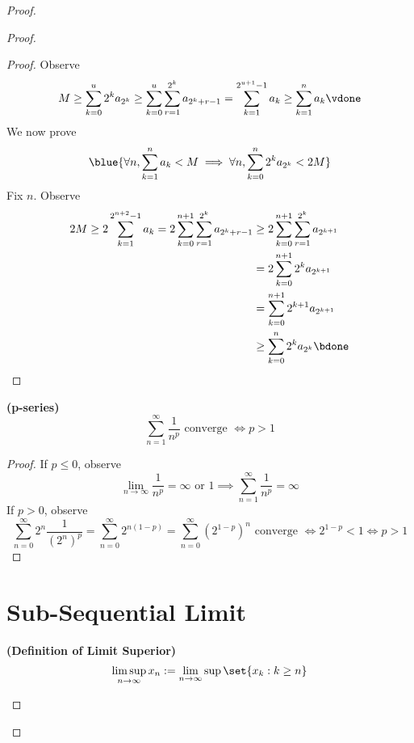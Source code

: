 \documentclass{report}
\begin{document}
\begin{proof}
\begin{proof}
\begin{proof}
Observe
\begin{equation*}
M\geq \sum_{k=0}^u 2^k a_{2^k}\geq \sum_{k=0}^u \sum_{r=1}^{2^k} a_{2^{k}+r-1}=\sum_{k=1}^{2^{u+1}-1} a_k\geq \sum_{k=1}^n a_k\vdone
\end{equation*}
We now prove
\begin{equation*}
  \blue{\forall n,\sum_{k=1}^n a_k<M\implies \forall n, \sum_{k=0}^n 2^ka_{2^k}<2M}
\end{equation*}
Fix $n$. Observe
\begin{align*}
  2M\geq 2\sum_{k=1}^{2^{n+2}-1} a_k=2\sum_{k=0}^{n+1}\sum_{r=1}^{2^k}a_{2^k+r-1}&\geq 2\sum_{k=0}^{n+1} \sum_{r=1}^{2^k}a_{2^{k+1}}\\
  &=2\sum_{k=0}^{n+1} 2^ka_{2^{k+1}}\\
  &=\sum_{k=0}^{n+1} 2^{k+1}a_{2^{k+1}}\\
  &\geq \sum_{k=0}^n 2^{k}a_{2^k}\bdone
\end{align*}
\end{proof}
\begin{corollary}
\label{4.3.12}
\textbf{(p-series)}
\begin{equation*}
\sum_{n=1}^\infty \frac{1}{n^p}\text{ converge }\iff  p>1
\end{equation*}
\end{corollary}
\begin{proof}
If $p\leq 0$, observe
\begin{equation*}
\lim_{n\to\infty}\frac{1}{n^p}=\infty\text{ or }1\implies \sum_{n=1}^\infty \frac{1}{n^p}=\infty
\end{equation*}
If $p>0$, observe
 \begin{equation*}
\sum_{n=0}^\infty 2^n \frac{1}{(2^n)^p}=\sum_{n=0}^\infty 2^{n(1-p)}=\sum_{n=0}^\infty (2^{1-p})^n\text{ converge }\iff 2^{1-p}<1\iff p>1
\end{equation*}
\end{proof}

\section{Sub-Sequential Limit}
\begin{definition}
\label{4.4.1}
\textbf{(Definition of Limit Superior)} 
\begin{equation*}
\limsup_{n\to\infty} x_n:= \lim_{n\to\infty} \sup \set{x_k:k\geq n}
\end{equation*}
\end{definition}
\end{proof}
\end{proof}
\end{document}

